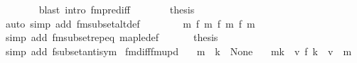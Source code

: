 \begin{isabellebody}
\ \ \ \ \ \ \isamarkupfalse%
\ {\isacharparenleft}{\kern0pt}blast\ intro{\isacharcolon}{\kern0pt}\ fmpred{\isacharunderscore}{\kern0pt}iff{\isacharparenright}{\kern0pt}\isanewline
\ \ \ \ \isamarkupfalse%
\ \isamarkupfalse%
\ {\isacharquery}{\kern0pt}thesis\isanewline
\ \ \ \ \ \ \isamarkupfalse%
\ {\isacharparenleft}{\kern0pt}auto\ simp\ add{\isacharcolon}{\kern0pt}\ fmsubset{\isacharunderscore}{\kern0pt}alt{\isacharunderscore}{\kern0pt}def{\isacharparenright}{\kern0pt}\isanewline
\ \ \isamarkupfalse%
\isanewline
\ \ \isamarkupfalse%
\ \isamarkupfalse%
\ {\isachardoublequoteopen}m\ {\isasymsubseteq}\isactrlsub f\ m\ {\isacharplus}{\kern0pt}{\isacharplus}{\kern0pt}\isactrlsub f\ {\isacharparenleft}{\kern0pt}m\ {\isacharminus}{\kern0pt}{\isacharminus}{\kern0pt}\isactrlsub f\ m\isanewline
\ \ \ \ \isamarkupfalse%
\ {\isacharparenleft}{\kern0pt}simp\ add{\isacharcolon}{\kern0pt}\ fmsubset{\isachardot}{\kern0pt}rep{\isacharunderscore}{\kern0pt}eq\ map{\isacharunderscore}{\kern0pt}le{\isacharunderscore}{\kern0pt}def{\isacharparenright}{\kern0pt}\isanewline
\ \ \isamarkupfalse%
\ {\isacharasterisk}{\kern0pt}\ \isamarkupfalse%
\ {\isacharquery}{\kern0pt}thesis\isanewline
\ \ \ \ \isamarkupfalse%
\ {\isacharparenleft}{\kern0pt}simp\ add{\isacharcolon}{\kern0pt}\ fsubset{\isacharunderscore}{\kern0pt}antisym{\isacharparenright}{\kern0pt}\isanewline
{}\isamarkupfalse%
%
\endisatagproof
{\isafoldproof}%
%
\isadelimproof
\isanewline
%
\endisadelimproof
\isanewline
{}\isamarkupfalse%
\ fmdiff{\isacharunderscore}{\kern0pt}fmupd{\isacharcolon}{\kern0pt}\isanewline
\ \ \ {\isachardoublequoteopen}m\ {\isachardollar}{\kern0pt}{\isachardollar}{\kern0pt}\ k\ {\isacharequal}{\kern0pt}\ None{\isachardoublequoteclose}\isanewline
\ \ \ {\isachardoublequoteopen}m{\isacharparenleft}{\kern0pt}k\ {\isachardollar}{\kern0pt}{\isachardollar}{\kern0pt}{\isacharcolon}{\kern0pt}{\isacharequal}{\kern0pt}\ v{\isacharparenright}{\kern0pt}\ {\isacharminus}{\kern0pt}{\isacharminus}{\kern0pt}\isactrlsub f\ {\isacharbraceleft}{\kern0pt}k\ {\isachardollar}{\kern0pt}{\isachardollar}{\kern0pt}{\isacharcolon}{\kern0pt}{\isacharequal}{\kern0pt}\ v{\isacharbraceright}{\kern0pt}\ {\isacharequal}{\kern0pt}\ m{\isachardoublequoteclose}\isanewline

\end{isabellebody}
